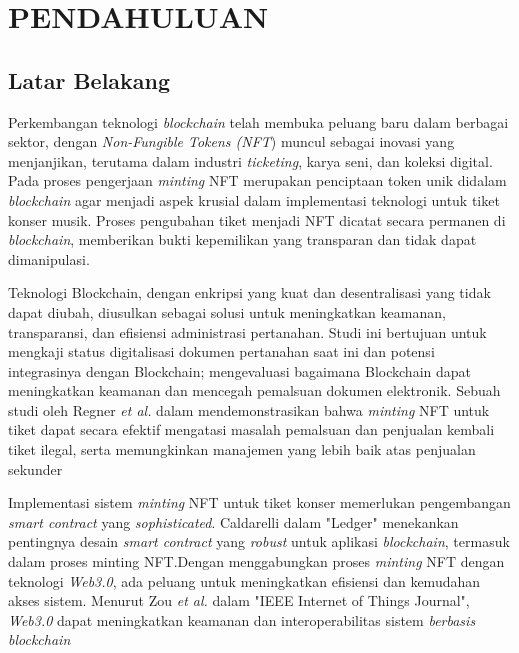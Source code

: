 \chapter{PENDAHULUAN}

\section{Latar Belakang}

    

Perkembangan teknologi \textit{blockchain} telah membuka peluang baru dalam berbagai sektor, dengan \textit{Non-Fungible Tokens (NFT}) muncul sebagai inovasi yang menjanjikan, terutama dalam industri \textit{ticketing}, karya seni, dan koleksi digital. Pada proses pengerjaan \textit{minting} NFT merupakan penciptaan token unik didalam \textit{blockchain} agar menjadi aspek krusial dalam implementasi teknologi untuk tiket konser musik. Proses pengubahan tiket menjadi NFT dicatat secara permanen di \textit{blockchain}, memberikan bukti kepemilikan yang transparan dan tidak dapat dimanipulasi.

Teknologi Blockchain, dengan enkripsi yang kuat dan desentralisasi yang tidak dapat diubah, diusulkan sebagai solusi untuk meningkatkan keamanan, transparansi, dan efisiensi administrasi pertanahan. Studi ini bertujuan untuk mengkaji status digitalisasi dokumen pertanahan saat ini dan potensi integrasinya dengan Blockchain; mengevaluasi bagaimana Blockchain dapat meningkatkan keamanan dan mencegah pemalsuan dokumen elektronik\cite{ref2}. Sebuah studi oleh Regner \textit{et al.}  dalam mendemonstrasikan bahwa \textit{minting} NFT untuk tiket dapat secara efektif mengatasi masalah pemalsuan dan penjualan kembali tiket ilegal, serta memungkinkan manajemen yang lebih baik atas penjualan sekunder\cite{ref3}

Implementasi sistem \textit{minting} NFT untuk tiket konser memerlukan pengembangan \textit{smart contract} yang \textit{sophisticated}. Caldarelli  dalam "Ledger" menekankan pentingnya desain \textit{smart contract} yang \textit{robust} untuk aplikasi \textit{blockchain}, termasuk dalam proses minting NFT\cite{ref4}.Dengan menggabungkan proses \textit{minting} NFT dengan teknologi \textit{Web3.0}, ada peluang untuk meningkatkan efisiensi dan kemudahan akses sistem. Menurut Zou \textit{et al.} dalam "IEEE Internet of Things Journal", \textit{Web3.0 }dapat meningkatkan keamanan dan interoperabilitas sistem \textit{berbasis} \textit{blockchain}\cite{ref5}

